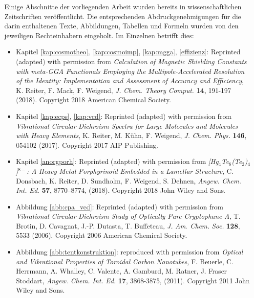 Einige Abschnitte der vorliegenden Arbeit wurden bereits in wissenschaftlichen Zeitschriften veröffentlicht. Die entsprechenden Abdruckgenehmigungen für die darin enthaltenen Texte, Abbildungen, Tabellen und Formeln wurden von den jeweiligen Rechteinhabern eingeholt. Im Einzelnen betrifft dies:

\begin{itemize}
\item{Kapitel \ref{kap:cosmotheo}, \ref{kap:cosmoimp}, \ref{kap:mgga}, \ref{effizienz}: Reprinted (adapted) with permission from \textit{Calculation of Magnetic Shielding Constants with meta-GGA Functionals Employing the Multipole-Accelerated Resolution of the Identity: Implementation and Assessment of Accuracy and Efficiency}, K. Reiter, F. Mack, F. Weigend, \textit{J. Chem. Theory Comput.} \textbf{14}, 191-197 (2018). Copyright 2018 American Chemical Society.}
\item{Kapitel \ref{kap:ecps}, \ref{kap:vcd}: Reprinted (adapted) with permission from \textit{Vibrational Circular Dichroism Spectra for Large Molecules and Molecules with Heavy Elements}, K. Reiter, M. Kühn, F. Weigend, \textit{J. Chem. Phys.} \textbf{146}, 054102 (2017). Copyright 2017 AIP Publishing.}
\item{Kapitel \ref{anorgporh}: Reprinted (adapted) with permission from \textit{[Hg$_4$Te$_8$(Te$_2$)$_4$]$^{8-}$: A Heavy Metal Porphyrinoid Embedded in a Lamellar Structure}, C. Donsbach, K. Reiter, D. Sundholm, F. Weigend, S. Dehnen, \textit{Angew. Chem. Int. Ed.} \textbf{57}, 8770–8774, (2018). Copyright 2018 John Wiley and Sons.}
\item{Abbildung \ref{abb:cpa_vcd}: Reprinted (adapted) with permission from \textit{Vibrational Circular Dichroism Study of Optically Pure Cryptophane-A}, T. Brotin, D. Cavagnat, J.-P. Dutasta, T. Buffeteau, \textit{J. Am. Chem. Soc.} \textbf{128}, 5533 (2006). Copyright 2006 American Chemical Society.}
\item{Abbildung \ref{abb:tcntkonstruktion}: reproduced with permission from \textit{Optical and Vibrational Properties of Toroidal Carbon Nanotubes}, F. Beuerle, C. Herrmann, A. Whalley, C. Valente, A. Gamburd, M. Ratner, J. Fraser Stoddart, \textit{Angew. Chem. Int. Ed.} \textbf{17}, 3868-3875, (2011). Copyright 2011 John Wiley and Sons.}
\end{itemize}